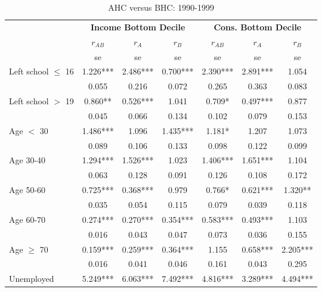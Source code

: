 \begin{table}
\caption{AHC versus BHC: 1990-1999}
\centering
\begin{tabular}{l|ccc|ccc}
\hline\hline 
	& \multicolumn{3}{c}{\textbf{Income Bottom Decile}} &  \multicolumn{3}{c}{\textbf{Cons. Bottom Decile}} \\
	&	$r_{AB}$	&	$r_{A}$	&	$r_{B}$	&	$r_{AB}$	&	$r_{A}$	&	$r_{B}$	\\
  & se & se & se  & se & se & se \\
\hline
Left school $\leq$ 16	&	       1.226***	&	       2.486***	&	       0.700***	&	       2.390***	&	       2.891***	&	1.054	\\
                    	&	       0.055   	&	0.216	&	0.072	&	       0.265   	&	0.363	&	0.083	\\
Left school $>$ 19	&	       0.860** 	&	       0.526***	&	1.041	&	       0.709*  	&	       0.497***	&	0.877	\\
                    	&	       0.045   	&	0.066	&	0.134	&	       0.102   	&	0.079	&	0.153	\\
Age $<$ 30	&	       1.486***	&	1.096	&	       1.435***	&	       1.181*  	&	1.207	&	1.073	\\
                    	&	       0.089   	&	0.106	&	0.133	&	       0.098   	&	0.122	&	0.099	\\
Age 30-40	&	       1.294***	&	       1.526***	&	1.023	&	       1.406***	&	       1.651***	&	1.104	\\
                    	&	       0.063   	&	0.128	&	0.091	&	       0.126   	&	0.108	&	0.172	\\
Age 50-60	&	       0.725***	&	       0.368***	&	0.979	&	       0.766*  	&	       0.621***	&	       1.320** 	\\
                    	&	       0.035   	&	0.054	&	0.115	&	       0.079   	&	0.039	&	0.118	\\
Age 60-70	&	       0.274***	&	       0.270***	&	       0.354***	&	       0.583***	&	       0.493***	&	1.103	\\
                    	&	       0.016   	&	0.043	&	0.047	&	       0.073   	&	0.036	&	0.155	\\
Age $\geq$ 70	&	       0.159***	&	       0.259***	&	       0.364***	&	       1.155   	&	       0.658***	&	       2.205***	\\
                    	&	       0.016   	&	0.041	&	0.046	&	       0.161   	&	0.043	&	0.295	\\
Unemployed	&	       5.249***	&	       6.063***	&	       7.492***	&	       4.816***	&	       3.289***	&	       4.494***	\\

\end{tabular}
\end{table}
